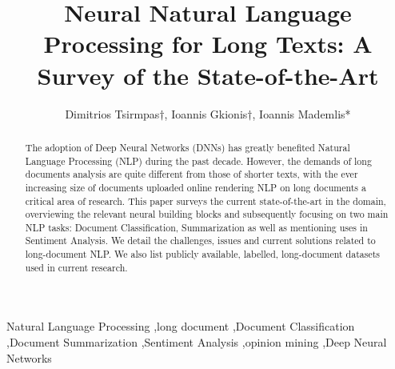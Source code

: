\documentclass[preprint,review,12pt]{elsarticle}
\begin{document}
\begin{frontmatter}

\title{Neural Natural Language Processing for Long Texts: A Survey of the State-of-the-Art}

\author{Dimitrios Tsirmpas$\dagger$, Ioannis Gkionis$\dagger$, Ioannis Mademlis*}
\address{Department of Informatics, Athens University of Economics and Business}
            
\begin{abstract}
The adoption of Deep Neural Networks (DNNs) has greatly benefited Natural Language Processing (NLP) during the past decade. However, the demands of long documents analysis are quite different from those of shorter texts, with the ever increasing size of documents uploaded online rendering NLP on long documents a critical area of research. This paper surveys the current state-of-the-art in the domain, overviewing the relevant neural building blocks and subsequently focusing on two main NLP tasks: Document Classification, Summarization as well as mentioning uses in Sentiment Analysis. We detail the challenges, issues and current solutions related to long-document NLP. We also list publicly available, labelled, long-document datasets used in current research.
\end{abstract}



\begin{keyword}
Natural Language Processing \sep long document \sep Document Classification \sep Document Summarization \sep Sentiment Analysis \sep opinion mining \sep Deep Neural Networks
\end{keyword}

\end{frontmatter}
\end{document}
